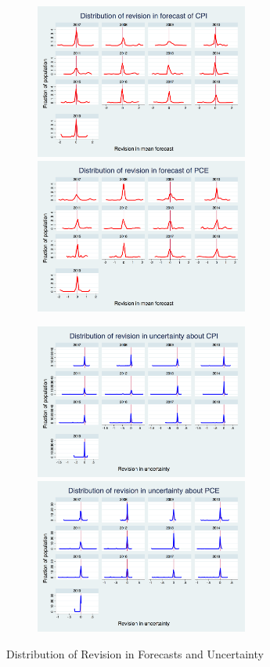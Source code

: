 \documentclass[12pt]{article}
\begin{document}
	
	\begin{figure}[ht]
		\begin{subfigure}[b]{0.5\textwidth}
		\centering
		\includegraphics[width=7cm]{figures/PRCCPIMean01_rv_true_hist.png} 
		\smallskip
		\includegraphics[width=7cm]{figures/PRCPCEMean01_rv_true_hist.png} 
		\end{subfigure}
		   \hfill 
		\begin{subfigure}[b]{0.5\textwidth}
		\includegraphics[width=7cm]{figures/PRCCPIVar01_rv_true_hist.png}  
		\smallskip
		\includegraphics[width=7cm]{figures/PRCPCEVar01_rv_true_hist.png} 
		\end{subfigure}
		\caption{Distribution of Revision in Forecasts and Uncertainty}
		\label{RevisionHist}
	\end{figure}
	
\end{document}
